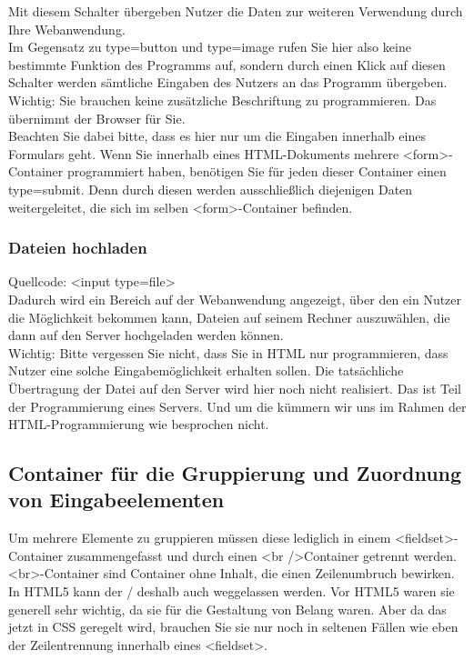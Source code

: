 Mit diesem Schalter übergeben Nutzer die Daten zur weiteren Verwendung durch Ihre Webanwendung.\\

Im Gegensatz zu type=button und type=image rufen Sie hier also keine bestimmte Funktion des Programms auf, sondern durch einen Klick auf diesen Schalter werden sämtliche Eingaben des Nutzers an das Programm übergeben.\\

Wichtig: Sie brauchen keine zusätzliche Beschriftung zu programmieren. Das übernimmt der Browser für Sie.\\

Beachten Sie dabei bitte, dass es hier nur um die Eingaben innerhalb eines Formulars geht. Wenn Sie innerhalb eines HTML-Dokuments mehrere <form>-Container programmiert haben, benötigen Sie für jeden dieser Container einen type=submit. Denn durch diesen werden ausschließlich diejenigen Daten weitergeleitet, die sich im selben <form>-Container befinden.

\subsubsection{Dateien hochladen}

Quellcode: <input type=file>\\

Dadurch wird ein Bereich auf der Webanwendung angezeigt, über den ein Nutzer die Möglichkeit bekommen kann, Dateien auf seinem Rechner auszuwählen, die dann auf den Server hochgeladen werden können.\\

Wichtig: Bitte vergessen Sie nicht, dass Sie in HTML nur programmieren, dass Nutzer eine solche Eingabemöglichkeit erhalten sollen. Die tatsächliche Übertragung der Datei auf den Server wird hier noch nicht realisiert. Das ist Teil der Programmierung eines Servers. Und um die kümmern wir uns im Rahmen der HTML-Programmierung wie besprochen nicht.

\subsection{Container für die Gruppierung und Zuordnung von Eingabeelementen}

Um mehrere Elemente zu gruppieren müssen diese lediglich in einem <fieldset>-Container zusammengefasst und durch einen <br />Container getrennt werden. <br>-Container sind Container ohne Inhalt, die einen Zeilenumbruch bewirken. In HTML5 kann der / deshalb auch weggelassen werden. Vor HTML5 waren sie generell sehr wichtig, da sie für die Gestaltung von Belang waren. Aber da das jetzt in CSS geregelt wird, brauchen Sie sie nur noch in seltenen Fällen wie eben der Zeilentrennung innerhalb eines <fieldset>.\\

